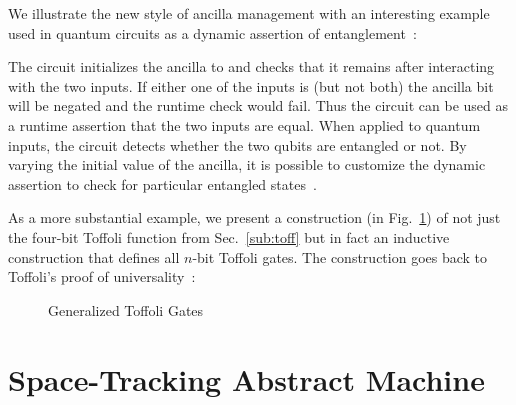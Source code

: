 \documentclass[sigplan,10pt,review,anonymous]{acmart}
\begin{document}
\PIFDinterp{}

\begin{figure}
  
\end{figure}
We illustrate the new style of ancilla management with an interesting
example used in quantum circuits as a dynamic assertion of
entanglement~\cite{DBLP:journals/cal/ZhouB19}:

\PIFDparity{}

\noindent The circuit initializes the ancilla to  and
checks that it remains  after interacting with the two
inputs. If either one of the inputs is  (but not both)
the ancilla bit will be negated and the runtime check would fail. Thus
the circuit can be used as a runtime assertion that the two inputs are
equal. When applied to quantum inputs, the circuit detects whether the
two qubits are entangled or not. By varying the initial value of the
ancilla, it is possible to customize the dynamic assertion to check
for particular entangled states~\cite{DBLP:journals/cal/ZhouB19}.

As a more substantial example, we present a construction (in
Fig.~\ref{fig:toff}) of not just the four-bit Toffoli function from
Sec.~\ref{sub:toff} but in fact an inductive construction that defines
all $n$-bit Toffoli gates. The construction goes back to Toffoli's
proof of universality~\cite{Toffoli:1980}:

\begin{figure}[ht]
  \PIFDtoffoli{}
\caption{\label{fig:toff}Generalized Toffoli Gates}
\end{figure}

\section{Space-Tracking Abstract Machine}
\label{sec:space}
\end{document}
